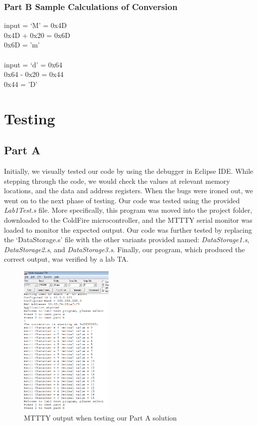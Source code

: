 \documentclass[letterpaper]{article}
\begin{document}

    \subsubsection{Part B Sample Calculations of Conversion}

    input = `M' = 0x4D\\
    0x4D + 0x20 = 0x6D\\
    0x6D = 'm'\\
    \\
    input = `d' = 0x64\\
    0x64 - 0x20 = 0x44\\
    0x44 = 'D'


\section{Testing}
  \subsection{Part A}
    Initially, we visually tested our code by using the debugger in Eclipse IDE.
    While stepping through the code, we would check the values at relevant memory
    locations, and the data and address registers. When the bugs were ironed out,
    we went on to the next phase of testing.
    Our code was tested using the provided \textit{Lab1Test.s} file. More specifically,
    this program was moved into the project folder, downloaded to the ColdFire microcontroller,
    and the MTTTY serial monitor was loaded to monitor the expected output. Our code was
    further tested by replacing the `DataStorage.s' file with the other variants provided
    named: \textit{DataStorage1.s}, \textit{DataStorage2.s}, and \textit{DataStorage3.s}.
    Finally, our program, which produced the correct output, was verified by a lab TA.

    \begin{figure}[H]
      \centering
      \includegraphics[width=0.4\textwidth]{tst1a.png}
      \caption{MTTTY output when testing our Part A solution}
    \end{figure}
\end{document}
